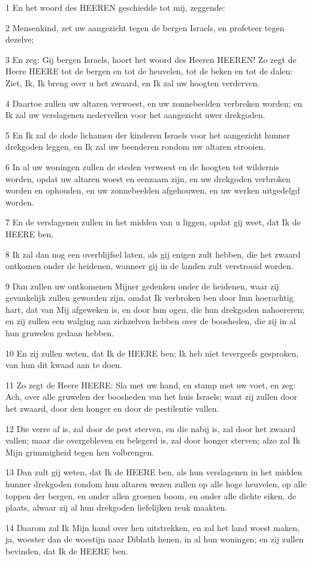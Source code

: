 \par 1 En het woord des HEEREN geschiedde tot mij, zeggende:
\par 2 Mensenkind, zet uw aangezicht tegen de bergen Israels, en profeteer tegen dezelve;
\par 3 En zeg: Gij bergen Israels, hoort het woord des Heeren HEEREN! Zo zegt de Heere HEERE tot de bergen en tot de heuvelen, tot de beken en tot de dalen: Ziet, Ik, Ik breng over u het zwaard, en Ik zal uw hoogten verderven.
\par 4 Daartoe zullen uw altaren verwoest, en uw zonnebeelden verbroken worden; en Ik zal uw verslagenen nedervellen voor het aangezicht uwer drekgoden.
\par 5 En Ik zal de dode lichamen der kinderen Israels voor het aangezicht hunner drekgoden leggen, en Ik zal uw beenderen rondom uw altaren strooien.
\par 6 In al uw woningen zullen de steden verwoest en de hoogten tot wildernis worden, opdat uw altaren woest en eenzaam zijn, en uw drekgoden verbroken worden en ophouden, en uw zonnebeelden afgehouwen, en uw werken uitgedelgd worden.
\par 7 En de verslagenen zullen in het midden van u liggen, opdat gij weet, dat Ik de HEERE ben.
\par 8 Ik zal dan nog een overblijfsel laten, als gij enigen zult hebben, die het zwaard ontkomen onder de heidenen, wanneer gij in de landen zult verstrooid worden.
\par 9 Dan zullen uw ontkomenen Mijner gedenken onder de heidenen, waar zij gevankelijk zullen geworden zijn, omdat Ik verbroken ben door hun hoerachtig hart, dat van Mij afgeweken is, en door hun ogen, die hun drekgoden nahoereren; en zij zullen een walging aan zichzelven hebben over de boosheden, die zij in al hun gruwelen gedaan hebben.
\par 10 En zij zullen weten, dat Ik de HEERE ben; Ik heb niet tevergeefs gesproken, van hun dit kwaad aan te doen.
\par 11 Zo zegt de Heere HEERE: Sla met uw hand, en stamp met uw voet, en zeg: Ach, over alle gruwelen der boosheden van het huis Israels; want zij zullen door het zwaard, door den honger en door de pestilentie vallen.
\par 12 Die verre af is, zal door de pest sterven, en die nabij is, zal door het zwaard vallen; maar die overgebleven en belegerd is, zal door honger sterven; alzo zal Ik Mijn grimmigheid tegen hen volbrengen.
\par 13 Dan zult gij weten, dat Ik de HEERE ben, als hun verslagenen in het midden hunner drekgoden rondom hun altaren wezen zullen op alle hoge heuvelen, op alle toppen der bergen, en onder allen groenen boom, en onder alle dichte eiken, de plaats, alwaar zij al hun drekgoden liefelijken reuk maakten.
\par 14 Daarom zal Ik Mijn hand over hen uitstrekken, en zal het land woest maken, ja, woester dan de woestijn naar Diblath henen, in al hun woningen; en zij zullen bevinden, dat Ik de HEERE ben.

